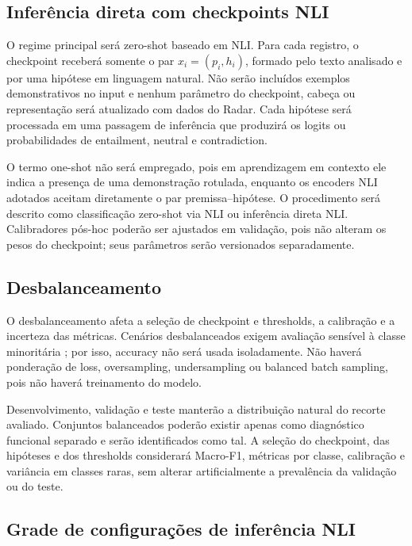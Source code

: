 \subsection{Inferência direta com checkpoints NLI}

O regime principal será zero-shot baseado em NLI. Para cada registro, o checkpoint receberá somente o par \(x_i=(p_i,h_i)\), formado pelo texto analisado e por uma hipótese em linguagem natural. Não serão incluídos exemplos demonstrativos no input e nenhum parâmetro do checkpoint, cabeça ou representação será atualizado com dados do Radar. Cada hipótese será processada em uma passagem de inferência que produzirá os logits ou probabilidades de entailment, neutral e contradiction.

O termo one-shot não será empregado, pois em aprendizagem em contexto ele indica a presença de uma demonstração rotulada, enquanto os encoders NLI adotados aceitam diretamente o par premissa--hipótese. O procedimento será descrito como classificação zero-shot via NLI ou inferência direta NLI. Calibradores pós-hoc poderão ser ajustados em validação, pois não alteram os pesos do checkpoint; seus parâmetros serão versionados separadamente.

\subsection{Desbalanceamento}

O desbalanceamento afeta a seleção de checkpoint e thresholds, a calibração e a incerteza das métricas. Cenários desbalanceados exigem avaliação sensível à classe minoritária \cite{hegarcia2009}; por isso, accuracy não será usada isoladamente. Não haverá ponderação de loss, oversampling, undersampling ou balanced batch sampling, pois não haverá treinamento do modelo.

Desenvolvimento, validação e teste manterão a distribuição natural do recorte avaliado. Conjuntos balanceados poderão existir apenas como diagnóstico funcional separado e serão identificados como tal. A seleção do checkpoint, das hipóteses e dos thresholds considerará Macro-F1, métricas por classe, calibração e variância em classes raras, sem alterar artificialmente a prevalência da validação ou do teste.

\subsection{Grade de configurações de inferência NLI}

